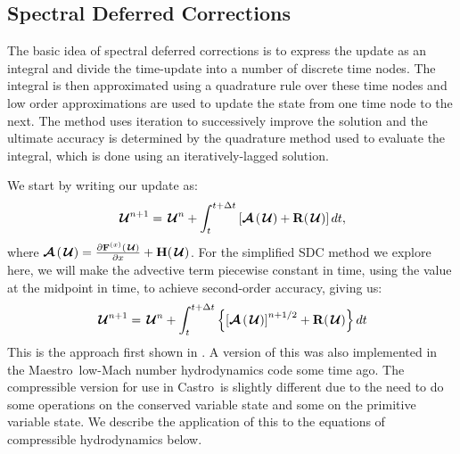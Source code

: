 \documentclass[times,modern]{aastex63}
\newcommand{\castro}{{\sf Castro}}
\newcommand{\maestro}{{\sf Maestro}}
\newcommand{\Uc}{{\,\bm{\mathcal{U}}}}
\newcommand{\Fb}{\mathbf{F}}
\newcommand{\xv}{{(x)}}
\newcommand{\Hb}{{\bf H}}
\newcommand{\Rb}{{\bf R}}
\newcommand{\Adv}[1]{{\left [\boldsymbol{\mathcal{A}} \left(#1\right)\right]}}
\newcommand{\Advs}[1]{\boldsymbol{\mathcal{A}} \left(#1\right)}
\begin{document}
\subsection{Spectral Deferred Corrections}

The basic idea of spectral deferred corrections is to express the
update as an integral and divide the time-update into a number of
discrete time nodes.  The integral is then approximated using a
quadrature rule over these time nodes and low order approximations are
used to update the state from one time node to the next.  The method
uses iteration to successively improve the solution and the ultimate
accuracy is determined by the quadrature method used to evaluate the
integral, which is done using an iteratively-lagged solution.

We start by writing our update as:
\begin{equation}
\Uc^{n+1} = \Uc^n + \int_t^{t+\Delta t} \left [ \Advs{\Uc} + \Rb(\Uc) \right ] dt,
\end{equation}
where $\Advs{\Uc} =  \frac{\partial \Fb^\xv (\Uc)}{\partial x} + \Hb(\Uc)$.
For the simplified SDC method we explore here, we will make the
advective term piecewise constant in time, using the value at the
midpoint in time, to achieve second-order accuracy, giving us:
\begin{equation}
\label{eq:integral:simplesdc}
\Uc^{n+1} = \Uc^n + \int_t^{t+\Delta t} \left \{ \Adv{\Uc}^{n+1/2} + \Rb(\Uc) \right \} dt
\end{equation}
This is the approach first shown in \citep{SDC-old}.  A
version of this was also implemented in the \maestro\ low-Mach number
hydrodynamics code some time ago.  The compressible version for use in
\castro\ is slightly different due to the need to do some operations
on the conserved variable state and some on the primitive variable
state.  We describe the application of this to the equations of
compressible hydrodynamics below.
\end{document}
